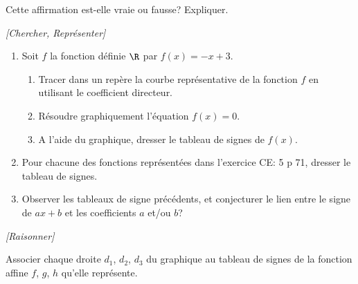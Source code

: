 Cette affirmation est-elle vraie ou fausse? Expliquer. 



\exo \textit{[Chercher, Représenter]}

\begin{enumerate}
\item Soit $f$ la fonction définie $\R$ par $f(x) = -x +3$.
\begin{enumerate}[label=\alph*)]
		\item Tracer dans un repère la courbe représentative de la fonction $f$ en utilisant le coefficient directeur.
	\item Résoudre graphiquement l’équation $f(x) =0$.
	\item A l’aide du graphique, dresser le tableau de signes de $f(x)$.
	\end{enumerate}
	
\item Pour chacune des fonctions représentées dans l'exercice CE: 5 p 71, dresser le tableau de signes.

\item Observer les tableaux de signe précédents, et conjecturer le lien entre le signe de $ax+b$ et les coefficients $a$ et/ou $b$?
\end{enumerate}


\exo \textit{[Raisonner]}

Associer chaque droite $d_1$, $d_2$, $d_3$ du graphique au tableau de signes de la fonction affine $f$, $g$, $h$ qu'elle représente.

\bigskip

